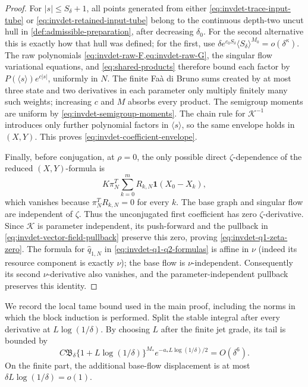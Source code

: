 \begin{proof}
For \(|s|\leq S_\delta+1\), all points generated from either
\cref{eq:invdet-trace-input-tube} or
\cref{eq:invdet-retained-input-tube} belong to the continuous depth-two
uncut hull in \cref{def:admissible-preparation}, after decreasing
\(\delta_0\).  For the second alternative this is exactly how that hull was
defined; for the first, use
\(\delta e^{c_0S_\delta}\langle S_\delta\rangle^{M_0}
=o(\delta^\kappa)\).  The raw
polynomials \cref{eq:invdet-raw-F,eq:invdet-raw-G}, the singular flow
variational equations, and \cref{eq:shared-products} therefore bound each
factor by \(P(\langle s\rangle)e^{c|s|}\), uniformly in \(N\).  The finite
Fa\`a di Bruno sums created by at most three state and two derivatives in
each parameter only multiply finitely many such weights; increasing
\(c\) and \(M\) absorbs every product.  The semigroup moments are uniform
by \cref{eq:invdet-semigroup-moments}.  The chain rule for
\(\mathcal K^{-1}\) introduces only further polynomial factors in
\(\langle s\rangle\), so the same envelope holds in \((X,Y)\).  This proves
\cref{eq:invdet-coefficient-envelope}.

Finally, before conjugation, at \(\rho=0\), the only possible direct
\(\zeta\)-dependence of the reduced \((X,Y)\)-formula is
\[
 K\pi_N^T\sum_{k=0}^mR_{k,N}\mathbf1(X_0-X_k),
\]
which vanishes because \(\pi_N^TR_{k,N}=0\) for every \(k\).
The base graph and singular flow are independent of \(\zeta\).  Thus the
unconjugated first coefficient has zero \(\zeta\)-derivative.  Since
\(\mathcal K\) is parameter independent, its push-forward and the pullback
in \cref{eq:invdet-vector-field-pullback} preserve this zero, proving
\cref{eq:invdet-q1-zeta-zero}.
The formula for \(\widehat q_{1,N}\) in
\cref{eq:invdet-q1-q2-formulas} is affine in \(\nu\) (indeed its resource
component is exactly \(\nu\)); the base flow is \(\nu\)-independent.
Consequently its second \(\nu\)-derivative also vanishes, and the
parameter-independent pullback preserves this identity.
\end{proof}

We record the local tame bound used in the main proof, including the norms
in which the block induction is performed.  Split the stable integral after
every derivative at \(L\log(1/\delta)\).  By choosing \(L\) after the finite
jet grade, its tail is bounded by
\begin{equation}
 C\mathfrak B_\delta
 \{1+L\log(1/\delta)\}^{M_*}
 e^{-a_*L\log(1/\delta)/2}=O(\delta^6).              \label{eq:invdet-convolution-tail}
\end{equation}
On the finite part, the additional base-flow displacement is at most
\(\delta L\log(1/\delta)=o(1)\).

